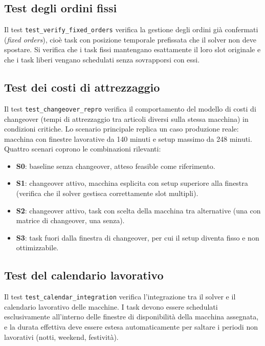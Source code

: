 \subsection{Test degli ordini fissi}

Il test \texttt{test\_verify\_fixed\_orders} verifica la gestione degli ordini già confermati (\textit{fixed orders}), cioè task con posizione temporale prefissata che il solver non deve spostare. Si verifica che i task fissi mantengano esattamente il loro slot originale e che i task liberi vengano schedulati senza sovrapporsi con essi.

\subsection{Test dei costi di attrezzaggio}

Il test \texttt{test\_changeover\_repro} verifica il comportamento del modello di costi di \gls{changeover} (tempi di attrezzaggio tra articoli diversi sulla stessa macchina) in condizioni critiche. Lo scenario principale replica un caso produzione reale: macchina con finestre lavorative da 140 minuti e setup massimo da 248 minuti. Quattro scenari coprono le combinazioni rilevanti:

\begin{itemize}
    \item \textbf{S0}: baseline senza changeover, atteso feasible come riferimento.
    \item \textbf{S1}: changeover attivo, macchina esplicita con setup superiore alla finestra (verifica che il solver gestisca correttamente slot multipli).
    \item \textbf{S2}: changeover attivo, task con scelta della macchina tra alternative (una con matrice di changeover, una senza).
    \item \textbf{S3}: task fuori dalla finestra di changeover, per cui il setup diventa fisso e non ottimizzabile.
\end{itemize}

\subsection{Test del calendario lavorativo}

Il test \texttt{test\_calendar\_integration} verifica l'integrazione tra il solver e il calendario lavorativo delle macchine. I task devono essere schedulati esclusivamente all'interno delle finestre di disponibilità della macchina assegnata, e la durata effettiva deve essere estesa automaticamente per saltare i periodi non lavorativi (notti, weekend, festività).

